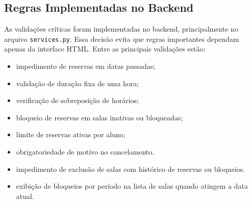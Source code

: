 \documentclass[12pt,a4paper]{article}
\begin{document}
\subsection{Regras Implementadas no Backend}
As validações críticas foram implementadas no backend, principalmente no arquivo \texttt{services.py}. Essa decisão evita que regras importantes dependam apenas da interface HTML. Entre as principais validações estão:
\begin{itemize}
    \item impedimento de reservas em datas passadas;
    \item validação de duração fixa de uma hora;
    \item verificação de sobreposição de horários;
    \item bloqueio de reservas em salas inativas ou bloqueadas;
    \item limite de reservas ativas por aluno;
    \item obrigatoriedade de motivo no cancelamento.
    \item impedimento de exclusão de salas com histórico de reservas ou bloqueios.
    \item exibição de bloqueios por período na lista de salas quando atingem a data atual.
\end{itemize}
\end{document}
